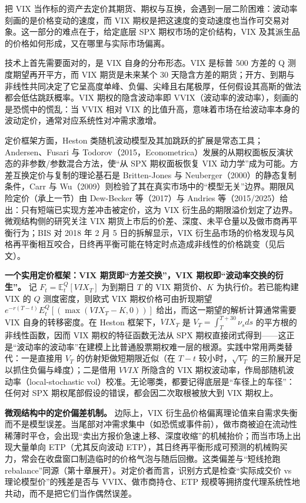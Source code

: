 \documentclass[11pt,a4paper]{ctexart}
\begin{document}
把 VIX 当作标的资产去定价其期货、期权与互换，会遇到一层二阶困难：波动率刻画的是价格变动的速度，而 VIX 期权是把这速度的变动速度也当作可交易对象。这一部分的难点在于，给定底层 SPX 期权市场的定价结构，VIX 及其派生品的价格如何形成，又在哪里与实际市场偏离。

技术上首先需要面对的，是 VIX 自身的分布形态。VIX 是标普 500 方差的 Q 测度期望再开平方，而 VIX 期货是未来某个 30 天隐含方差的期货；开方、到期与非线性共同决定了它呈高度单峰、负偏、尖峰且右尾极厚，任何假设其高斯的做法都会低估跳跃概率。VIX 期权的隐含波动率即 VVIX（波动率的波动率），刻画的是恐慌中的慌乱：当 VVIX 相对 VIX 的比值升高，意味着市场在给波动率本身的波动定价，通常对应系统性对冲需求激增。

定价框架方面，Heston 类随机波动模型及其加跳跃的扩展是常态工具；Andersen、Fusari 与 Todorov（2015，Econometrica）发展的从期权面板反演状态的非参数/参数混合方法，使“从 SPX 期权面板恢复 VIX 动力学”成为可能。方差互换定价与复制的理论基石是 Britten-Jones 与 Neuberger（2000）的静态复制条件，Carr 与 Wu（2009）则检验了其在真实市场中的“模型无关”边界。期限风险定价（承上一节）由 Dew-Becker 等（2017）与 Andries 等（2015/2025）给出：只有短端已实现方差冲击被定价，这为 VIX 衍生品的期限溢价划定了边界。微观结构侧的研究关注 VIX 期货上市后的价差、深度、未平仓量以及做市商再平衡行为；BIS 对 2018 年 2 月 5 日的拆解显示，VIX 衍生品市场的价格发现与风格再平衡相互咬合，日终再平衡可能在特定时点造成非线性的价格跳变（见后文）。

\textbf{一个实用定价框架：VIX 期货即“方差交换”，VIX 期权即“波动率交换的衍生”。} 记 $F_t=\mathbb E^Q_t[VIX_{T}]$ 为到期日 $T$ 的 VIX 期货价、$K$ 为执行价。若已能构建 VIX 的 $Q$ 测度密度，则欧式 VIX 期权价格可由折现期望 $e^{-r(T-t)}E^Q_t[(\max(VIX_T-K,0))]$ 给出，而这一期望的解析计算通常需要 VIX 自身的转移密度。在 Heston 框架下，$VIX_T$ 是 $V_T=\int_T^{T+30}\nu_s ds$ 的平方根的非线性函数，因而 VIX 期权的特征函数无法从 SPX 期权直接闭式得到——这正是“波动率的波动率”在建模上比普通股票期权难一层的根源。实践中常用两类替代：一是直接用 $V_T$ 的仿射矩做短期限近似（在 $T-t$ 较小时，$\sqrt{V_T}$ 的三阶展开足以抓住负偏与峰度）；二是借用 $VVIX$ 所隐含的 VIX 期权波动率，作局部随机波动率（local-stochastic vol）校准。无论哪类，都要记得底层是“车径上的车径”：任何对 SPX 期权尾部假设的错误，都会因二次取根被放大到 VIX 期权上。

\textbf{微观结构中的定价偏差机制。} 边际上，VIX 衍生品价格偏离理论值来自需求失衡而不是模型误差。当尾部对冲需求集中（如恐慌或事件前），做市商被迫在流动性稀薄时平仓，会出现“卖出方报价急速上移、深度收缩”的机械抬价；而当市场上出现大量单向 ETP（尤其反向波动 ETP），其日终再平衡形成可预测的机械购买力，常会在收盘窗口制造临时的价格气泡与随后回撤。这类偏差与“短线抢跑rebalance”同源（第十章展开）。对定价者而言，识别方式是检查“实际成交价 vs 理论模型价”的残差是否与 VVIX、做市商持仓、ETP 规模等拥挤度代理系统性地共动，而不是把它们当作偶然误差。
\end{document}
